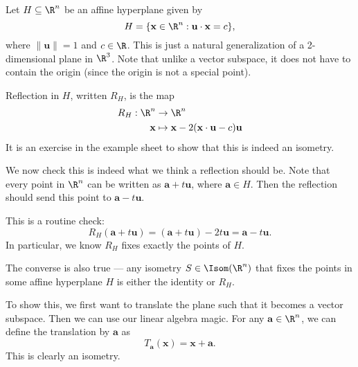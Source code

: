 \documentclass[a4paper]{article}
\begin{document}
\begin{eg}
  Let $H \subseteq \R^n$ be an affine hyperplane given by
  \[
    H = \{\mathbf{x} \in \R^n: \mathbf{u} \cdot \mathbf{x} = c\},
  \]
  where $\|\mathbf{u}\| = 1$ and $c \in \R$. This is just a natural generalization of a 2-dimensional plane in $\R^3$. Note that unlike a vector subspace, it does not have to contain the origin (since the origin is not a special point).

  Reflection in $H$, written $R_H$, is the map
  \begin{align*}
    R_H: \R^n &\to \R^n\\
    \mathbf{x} &\mapsto \mathbf{x} - 2(\mathbf{x} \cdot \mathbf{u} - c)\mathbf{u}
  \end{align*}
  It is an exercise in the example sheet to show that this is indeed an isometry.

  We now check this is indeed what we think a reflection should be. Note that every point in $\R^n$ can be written as $\mathbf{a} + t\mathbf{u}$, where $\mathbf{a} \in H$. Then the reflection should send this point to $\mathbf{a} - t\mathbf{u}$.
  \begin{center}
  \end{center}
  This is a routine check:
  \[
    R_H (\mathbf{a} + t\mathbf{u}) = (\mathbf{a} + t\mathbf{u}) - 2t\mathbf{u} = \mathbf{a} - t\mathbf{u}.
  \]
  In particular, we know $R_H$ fixes exactly the points of $H$.

  The converse is also true --- any isometry $S \in \Isom(\R^n)$ that fixes the points in some affine hyperplane $H$ is either the identity or $R_H$.

  To show this, we first want to translate the plane such that it becomes a vector subspace. Then we can use our linear algebra magic. For any $\mathbf{a} \in \R^n$, we can define the translation by $\mathbf{a}$ as
  \[
    T_{\mathbf{a}}(\mathbf{x}) = \mathbf{x} + \mathbf{a}.
  \]
  This is clearly an isometry.


\end{eg}
\end{document}
